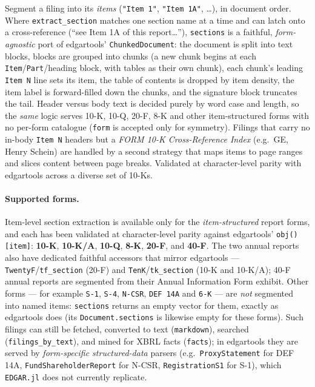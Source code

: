 \documentclass[11pt,a4paper]{report}
\begin{document}
\noindent Segment a filing into its \emph{items} (\texttt{"Item 1"}, \texttt{"Item 1A"}, \ldots), in
document order. Where \texttt{extract\_section} matches one section name at a time and can latch onto a
cross-reference (``see Item 1A of this report\ldots''), \texttt{sections} is a faithful, \emph{form-agnostic}
port of edgartools' \texttt{ChunkedDocument}: the document is split into text blocks, blocks are grouped
into chunks (a new chunk begins at each \texttt{Item}/\texttt{Part}/heading block, with tables as their own
chunk), each chunk's leading \texttt{Item N} line sets its item, the table of contents is dropped by item
density, the item label is forward-filled down the chunks, and the signature block truncates the tail.
Header versus body text is decided purely by word case and length, so the \emph{same} logic serves 10-K,
10-Q, 20-F, 8-K and other item-structured forms with no per-form catalogue (\texttt{form} is accepted only
for symmetry). Filings that carry no in-body \texttt{Item N} headers but a \emph{FORM 10-K Cross-Reference
Index} (e.g.\ GE, Henry Schein) are handled by a second strategy that maps items to page ranges and slices
content between page breaks. Validated at character-level parity with edgartools across a diverse set of
10-Ks.

\paragraph{Supported forms.} Item-level section extraction is available only for the \emph{item-structured}
report forms, and each has been validated at character-level parity against edgartools' \texttt{obj()[item]}:
\textbf{10-K}, \textbf{10-K/A}, \textbf{10-Q}, \textbf{8-K}, \textbf{20-F}, and \textbf{40-F}. The two annual
reports also have dedicated faithful accessors that mirror edgartools --- \texttt{TwentyF}/\texttt{tf\_section}
(20-F) and \texttt{TenK}/\texttt{tk\_section} (10-K and 10-K/A); 40-F annual reports are segmented from their
Annual Information Form exhibit. Other forms --- for example \texttt{S-1}, \texttt{S-4}, \texttt{N-CSR},
\texttt{DEF 14A} and \texttt{6-K} --- are \emph{not} segmented into named items: \texttt{sections} returns an
empty vector for them, exactly as edgartools does (its \texttt{Document.sections} is likewise empty for these
forms). Such filings can still be fetched, converted to text (\texttt{markdown}), searched
(\texttt{filings\_by\_text}), and mined for XBRL facts (\texttt{facts}); in edgartools they are served by
\emph{form-specific structured-data} parsers (e.g.\ \texttt{ProxyStatement} for DEF 14A,
\texttt{FundShareholderReport} for N-CSR, \texttt{RegistrationS1} for S-1), which \texttt{EDGAR.jl} does not
currently replicate.
\end{document}
